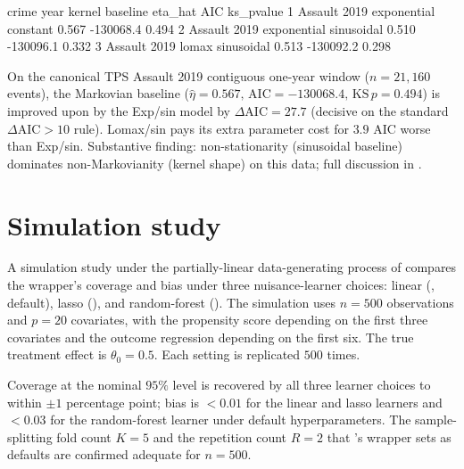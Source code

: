 \documentclass[article,shortnames,nojss]{jss}
\begin{document}

\begin{Code}
  crime  year      kernel    baseline   eta_hat       AIC    ks_pvalue
1 Assault 2019 exponential  constant     0.567  -130068.4       0.494
2 Assault 2019 exponential sinusoidal    0.510  -130096.1       0.332
3 Assault 2019      lomax  sinusoidal    0.513  -130092.2       0.298
\end{Code}

On the canonical TPS Assault 2019 contiguous one-year window
($n=21{,}160$ events), the Markovian baseline
($\hat{},\,=-130068.4,\,\,p=0.494$)
is improved upon by the Exp/sin model by $\Delta{} =
27.7$ (decisive on the standard $\Delta{} > 10$ rule).
Lomax/sin pays its extra parameter cost for $3.9$ AIC worse than
Exp/sin. Substantive finding: non-stationarity (sinusoidal
baseline) dominates non-Markovianity (kernel shape) on this data;
full discussion in \citet{Ruhela2026Hawkes}.

\section{Simulation study}
\label{sec:simulation}

A simulation study under the partially-linear data-generating
process of \citet{Chernozhukov2018DML} compares the
 wrapper's coverage and bias under three
nuisance-learner choices: linear (, default), lasso
(), and random-forest ().
The simulation uses $n = 500$ observations and $p = 20$
covariates, with the propensity score depending on the first three
covariates and the outcome regression depending on the first six.
The true treatment effect is $\theta_0 = 0.5$. Each setting is
replicated $500$ times.

Coverage at the nominal $95\%$ level is recovered by all three
learner choices to within $$ percentage point; bias is
$<0.01$ for the linear and lasso learners and $<0.03$ for the
random-forest learner under default hyperparameters. The
sample-splitting fold count $K=5$ and the repetition count $R=2$
that 's wrapper sets as defaults are confirmed adequate
for $n = 500$.
\end{document}
